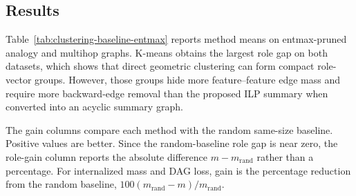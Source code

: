 \documentclass[../main.tex]{subfiles}
\begin{document}
\subsection{Results}

Table~\ref{tab:clustering-baseline-entmax} reports method means on entmax-pruned
analogy and multihop graphs. K-means obtains the largest role gap on both
datasets, which shows that direct geometric clustering can form compact
role-vector groups. However, those groups hide more feature--feature edge mass
and require more backward-edge removal than the proposed ILP summary when
converted into an acyclic summary graph.

The gain columns compare each method with the random same-size baseline.
Positive values are better. Since the random-baseline role gap is near zero, the
role-gain column reports the absolute difference $m-m_{\mathrm{rand}}$ rather
than a percentage. For internalized mass and DAG loss, gain is the percentage
reduction from the random baseline,
$100(m_{\mathrm{rand}}-m)/m_{\mathrm{rand}}$.
\end{document}
